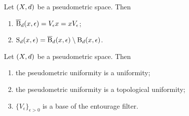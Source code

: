 \begin{lemma}
Let $\left( X,d \right)$ be a pseudometric space. Then
\begin{enumerate}
\item $\operatorname{\overline{B}}_d(x,\epsilon) = V_\epsilon x = xV_\epsilon$;
\item $\operatorname{S}_d(x,\epsilon) = \operatorname{\overline{B}}_d(x,\epsilon)\setminus \operatorname{B}_d(x,\epsilon)$.
\end{enumerate}
\end{lemma}

\begin{lemma}
Let $\left( X,d \right)$ be a pseudometric space. Then
\begin{enumerate}
\item the pseudometric uniformity is a uniformity;
\item the pseudometric uniformity is a topological uniformity;
\item $\{V_\epsilon\}_{\epsilon>0}$ is a base of the entourage filter.
\end{enumerate}
\end{lemma}
